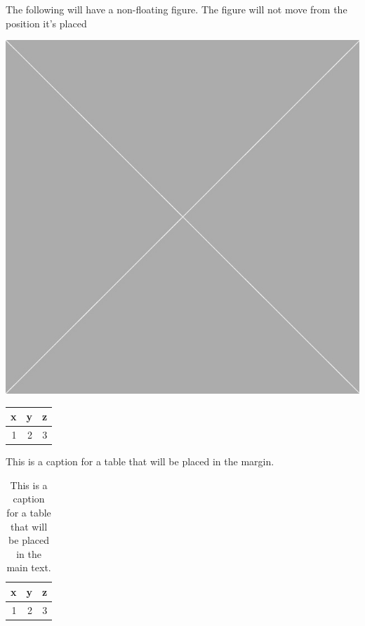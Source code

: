\documentclass[10pt,oneside]{book}
\begin{document}
The following will have a non-floating figure. The figure will not move from the position it's placed

\noindent
\begin{minipage}{0.9\linewidth}
  \centering
  \includegraphics[width=0.9\linewidth]{Pictures/placeholder.jpg}
  \label{fig:notfloatfig}
\end{minipage}



\begin{margintable}
  \centering
  \begin{tabular}{rrr}
    \toprule
    x & y & z \\
    \midrule
    1 & 2 & 3 \\
    \bottomrule
  \end{tabular}
  \caption{This is a caption for a table that will be placed in the margin.}\label{tab:tableexample1}
  \label{tab:margintab}
\end{margintable}


\begin{table}[bhpt]%
  \centering
  \begin{tabular}{rrr}
    \toprule
    x & y & z \\
    \midrule
    1 & 2 & 3 \\
    \bottomrule
  \end{tabular}
  \caption{This is a caption for a table that will be placed in the main text.}\label{tab:tableexample}
\end{table}
\end{document}
